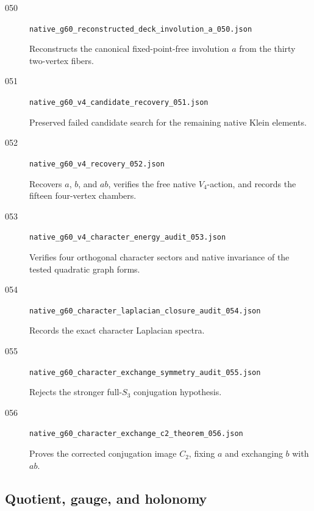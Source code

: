 \begin{description}
    \item[050]
    \texttt{native\_g60\_reconstructed\_deck\_involution\_a\_050.json}

    Reconstructs the canonical fixed-point-free involution \(a\) from
    the thirty two-vertex fibers.

    \item[051]
    \texttt{native\_g60\_v4\_candidate\_recovery\_051.json}

    Preserved failed candidate search for the remaining native Klein
    elements.

    \item[052]
    \texttt{native\_g60\_v4\_recovery\_052.json}

    Recovers \(a\), \(b\), and \(ab\), verifies the free native
    \(V_4\)-action, and records the fifteen four-vertex chambers.

    \item[053]
    \texttt{native\_g60\_v4\_character\_energy\_audit\_053.json}

    Verifies four orthogonal character sectors and native invariance
    of the tested quadratic graph forms.

    \item[054]
    \texttt{native\_g60\_character\_laplacian\_closure\_audit\_054.json}

    Records the exact character Laplacian spectra.

    \item[055]
    \texttt{native\_g60\_character\_exchange\_symmetry\_audit\_055.json}

    Rejects the stronger full-\(S_3\) conjugation hypothesis.

    \item[056]
    \texttt{native\_g60\_character\_exchange\_c2\_theorem\_056.json}

    Proves the corrected conjugation image \(C_2\), fixing \(a\) and
    exchanging \(b\) with \(ab\).
\end{description}

\subsection{Quotient, gauge, and holonomy}

